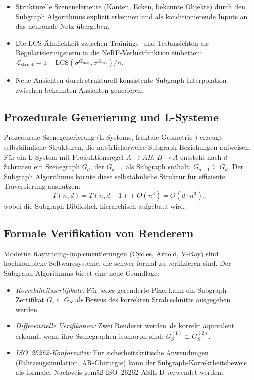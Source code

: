 ﻿\documentclass[a4paper,12pt]{article}
\theoremstyle{definition}
\begin{document}
\begin{itemize}
  \item Strukturelle Szenenelemente (Kanten, Ecken, bekannte
        Objekte) durch den Subgraph Algorithmus explizit erkennen
        und als konditionierende Inputs an das neuronale Netz
        übergeben.
  \item Die LCS-Ähnlichkeit zwischen Trainings- und
        Testansichten als Regularisierungsterm in die
        NeRF-Verlustfunktion einbetten:
        $\mathcal{L}_{\mathrm{struct}} = 1 -
        \mathrm{LCS}(\sigma^{G_{\mathrm{train}}},
        \sigma^{G_{\mathrm{test}}}) / n$.
  \item Neue Ansichten durch strukturell konsistente
        Subgraph-Interpolation zwischen bekannten Ansichten
        generieren.
\end{itemize}

\subsection{Prozedurale Generierung und L-Systeme}

Prozedurale Szenegenerierung (L-Systeme, fraktale Geometrie
\citep{Mandelbrot1982}) erzeugt selbstähnliche Strukturen, die
natürlicherweise Subgraph-Beziehungen aufweisen. Für ein
L-System mit Produktionsregel $A \to AB$, $B \to A$ entsteht
nach $d$ Schritten ein Szenegraph $G_d$, der $G_{d-1}$ als
Subgraph enthält: $G_{d-1} \subseteq G_d$. Der Subgraph
Algorithmus könnte diese selbstähnliche Struktur für
effiziente Traversierung ausnutzen:
\[
  T(n, d) = T(n, d-1) + O(n^3) = O(d \cdot n^3),
\]
wobei die Subgraph-Bibliothek hierarchisch aufgebaut wird.

\subsection{Formale Verifikation von Renderern}

Moderne Raytracing-Implementierungen (Cycles, Arnold, V-Ray) sind
hochkomplexe Softwaresysteme, die schwer formal zu verifizieren sind.
Der Subgraph Algorithmus bietet eine neue Grundlage:

\begin{itemize}
  \item \emph{Korrektheitszertifikate:} Für jedes gerenderte Pixel
        kann ein Subgraph-Zertifikat $G_r \subseteq G_S$ als
        Beweis des korrekten Strahlschnitts ausgegeben werden.
  \item \emph{Differenzielle Verifikation:} Zwei Renderer werden
        als korrekt äquivalent erkannt, wenn ihre Szenegraphen
        isomorph sind: $G_S^{(1)} \cong G_S^{(2)}$.
  \item \emph{ISO~26262-Konformität:} Für sicherheitskritische
        Anwendungen (Fahrzeugsimulation, AR-Chirurgie) kann der
        Subgraph-Korrektheitsbeweis als formaler Nachweis gemäß
        ISO~26262 ASIL-D verwendet werden.
\end{itemize}
\end{document}
